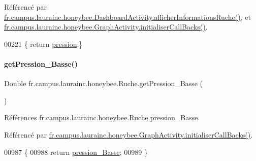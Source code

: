 Référencé par \hyperlink{classfr_1_1campus_1_1laurainc_1_1honeybee_1_1_dashboard_activity_a88f00531bee33bd6c47b33f5ac4df9ed}{fr.\+campus.\+laurainc.\+honeybee.\+Dashboard\+Activity.\+afficher\+Informations\+Ruche()}, et \hyperlink{classfr_1_1campus_1_1laurainc_1_1honeybee_1_1_graph_activity_a8dc56c3e0744bcb9295ad10e726b5fdb}{fr.\+campus.\+laurainc.\+honeybee.\+Graph\+Activity.\+initialiser\+Call\+Backs()}.


\begin{DoxyCode}
00221 \{ \textcolor{keywordflow}{return} \hyperlink{classfr_1_1campus_1_1laurainc_1_1honeybee_1_1_ruche_a73ddf7686cdd056fe7dc4b249f6ada86}{pression};\}
\end{DoxyCode}
\mbox{\label{classfr_1_1campus_1_1laurainc_1_1honeybee_1_1_ruche_a385eb9af510d10a97bfb2ee2ddd546b7}} 
\paragraph{\texorpdfstring{get\+Pression\+\_\+\+Basse()}{getPression\_Basse()}}
{\footnotesize\ttfamily Double fr.\+campus.\+laurainc.\+honeybee.\+Ruche.\+get\+Pression\+\_\+\+Basse (\begin{DoxyParamCaption}{ }\end{DoxyParamCaption})}



Références \hyperlink{classfr_1_1campus_1_1laurainc_1_1honeybee_1_1_ruche_a195271425f165de0607902f1c76a235a}{fr.\+campus.\+laurainc.\+honeybee.\+Ruche.\+pression\+\_\+\+Basse}.



Référencé par \hyperlink{classfr_1_1campus_1_1laurainc_1_1honeybee_1_1_graph_activity_a8dc56c3e0744bcb9295ad10e726b5fdb}{fr.\+campus.\+laurainc.\+honeybee.\+Graph\+Activity.\+initialiser\+Call\+Backs()}.


\begin{DoxyCode}
00987                                       \{
00988         \textcolor{keywordflow}{return} \hyperlink{classfr_1_1campus_1_1laurainc_1_1honeybee_1_1_ruche_a195271425f165de0607902f1c76a235a}{pression\_Basse};
00989     \}
\end{DoxyCode}
\mbox{\label{classfr_1_1campus_1_1laurainc_1_1honeybee_1_1_ruche_ae1602ae8e80e6c51a166251b981f99e0}} 
